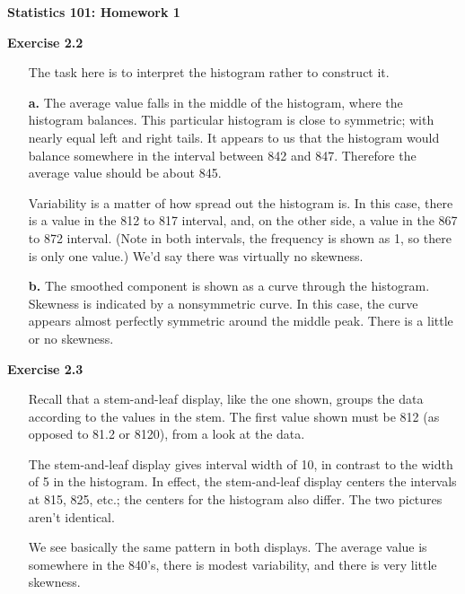 \documentclass[10pt]{article}
\begin{document}
\begin{center}
{\bf \large Statistics 101: Homework 1}
\end{center}


{\bf Exercise 2.2} 
\begin{itemize}
\item[\empty]The task here is to interpret the 
histogram rather to construct it.
\item[\bf a.] The average value falls in the middle of the histogram, where 
the histogram balances. This particular histogram is close to 
symmetric; with nearly equal left and right tails. It appears to us 
that the histogram would balance somewhere in the interval between 
842 and 847. Therefore the average value should be about 845.

Variability is a matter of how spread out the histogram is. In this 
case, there is a value in the 812 to 817 interval, and, on the other 
side, a value in the 867 to 872 interval. (Note in both intervals, 
the frequency is shown as 1, so there is only one value.) We'd say 
there was virtually no skewness.
\item[\bf b.] The smoothed component is shown as a curve through the 
histogram. Skewness is indicated by a nonsymmetric curve. In this 
case, the curve appears almost perfectly symmetric around the middle 
peak. There is a little or no skewness.
\end{itemize}

{\bf Exercise 2.3}

\begin{itemize}
\item[\empty] Recall that a stem-and-leaf display, like the one shown, 
groups the data according to the values in the stem. The first value 
shown must be 812 (as opposed to 81.2 or 8120), from a look at the 
data.

The stem-and-leaf display gives interval width of 10, in contrast to 
the width of 5 in the histogram. In effect, the stem-and-leaf display 
centers the intervals at 815, 825, etc.; the centers for the histogram 
also differ. The two pictures aren't identical.

We see basically the same pattern in both displays. The average value 
is somewhere in the 840's, there is modest variability, and there is 
very little skewness.
\end{itemize}
\end{document}
